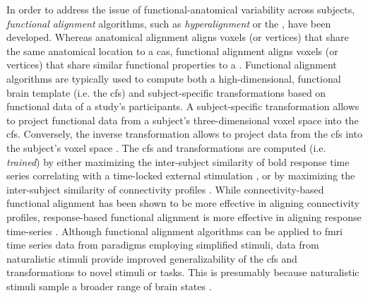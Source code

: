 %
%
In order to address the issue of functional-anatomical variability across
subjects, \textit{functional alignment} algorithms, such as
\textit{hyperalignment} \citep{haxby2011common, guntupalli2016model} or the
 \citep{chen2015reduced, zhang2016searchlight}, have been developed.
%
Whereas anatomical alignment aligns voxels (or vertices) that share the same
anatomical location to a \ac{cas}, functional alignment aligns voxels (or
vertices) that share similar functional properties to a .
%
Functional alignment algorithms are typically used to compute both a
high-dimensional, functional brain template (i.e. the \ac{cfs}) and
subject-specific transformations based on functional data of a study's
participants.
%
A subject-specific transformation allows to project functional data from a
subject's three-dimensional voxel space into the \ac{cfs}.
%
Conversely, the inverse transformation allows to project data from the \ac{cfs}
into the subject's voxel space \citep{haxby2020hyperalignment,
kumar2020brainiak}.
%
The \ac{cfs} and transformations are computed (i.e. \textit{trained}) by either
maximizing the inter-subject similarity of \ac{bold} response time series
correlating with a time-locked external stimulation \citep{haxby2011common,
chen2015reduced, sabuncu2010function}, or by maximizing the inter-subject
similarity of connectivity profiles \citep{feilong2018reliable,
guntupalli2018computational, nastase2019leveraging}.
%
While connectivity-based functional alignment has been shown to be more
effective in aligning connectivity profiles, response-based functional alignment
is more effective in aligning response time-series
\citep{guntupalli2018computational}.
%
Although functional alignment algorithms can be applied to \ac{fmri} time series
data from paradigms employing simplified stimuli, data from naturalistic stimuli
provide
%
improved generalizability of the \ac{cfs}
%
and transformations
%
to novel stimuli or tasks.
%
This is presumably because naturalistic stimuli sample a broader range of brain
states \citep{haxby2011common, guntupalli2016model}.

